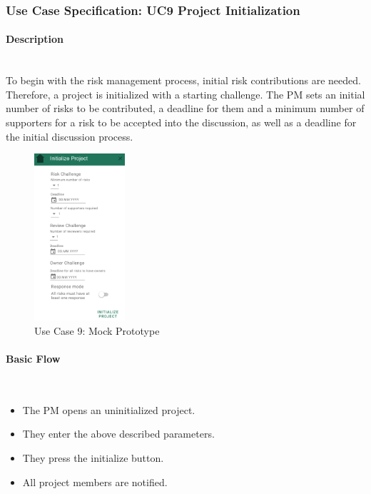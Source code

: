 
\newpage
\subsubsection{Use Case Specification: \ac{UC}9 Project Initialization}
\label{sec:domainBbj}

\paragraph*{Description}\mbox{}\\
To begin with the risk management process, initial risk contributions are needed. Therefore, a project is initialized with a starting challenge. The PM sets an initial number of risks to be contributed, a deadline for them and a minimum number of supporters for a risk to be accepted into the discussion, as well as a deadline for the initial discussion process.

\begin{figure}
	\includegraphics[width=0.3\textwidth]{Assets/UC_Screenshots/UC9S.png}
	\caption{Use Case 9: Mock Prototype}
	\label{fig:useCase9Detail}
\end{figure}

\paragraph*{Basic Flow} \mbox{}\\

\begin{itemize}
	\vspace{-3mm}
	\setlength\itemsep{-1em}
	\item The PM opens an uninitialized project.
	\item They enter the above described parameters.
	\item They press the initialize button.
	\item All project members are notified.
\end{itemize} 

